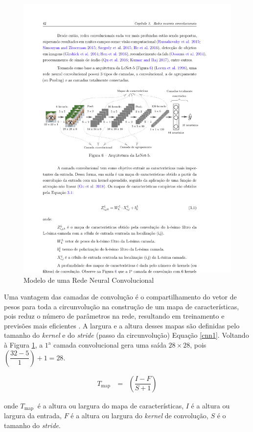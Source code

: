 \begin{figure}[!htb]
	\centering
	\caption{Modelo de uma Rede Neural Convolucional}
	\includegraphics[width=1\linewidth]{Apendices/Figuras/modelagem-24h/cnn}
	
	\label{fig:cnn}
\end{figure}


Uma vantagem das camadas de convolução é o compartilhamento do vetor de pesos para toda a circunvolução na construção de um mapa de características, pois reduz o número de parâmetros na rede, resultando em treinamento e previsões mais eficientes
\cite{lucas_2019}.
A largura e a altura desses mapas são definidas pelo tamanho do \textit{kernel} e do \textit{stride} (passo da circunvolução) Equação \eqref{cnn1}. Voltando à Figura \ref{fig:cnn}, a $1^{\mathrm{a}}$ camada convolucional gera uma saída $28 \times 28$, pois $\left(\dfrac{32-5}{1}\right)+1=28$.

\begin{eqnarray}
	T_{\text {map }}&=&\left(\dfrac{I-F}{S+1}\right)\label{cnn1}
\end{eqnarray}

\noindent onde
$T_{\text {map }}$ é a altura ou largura do mapa de características,
$I$ é a altura ou largura da entrada,
$F$ é a altura ou largura do \textit{kernel} de convolução,
$S$ é o tamanho do \textit{stride}.